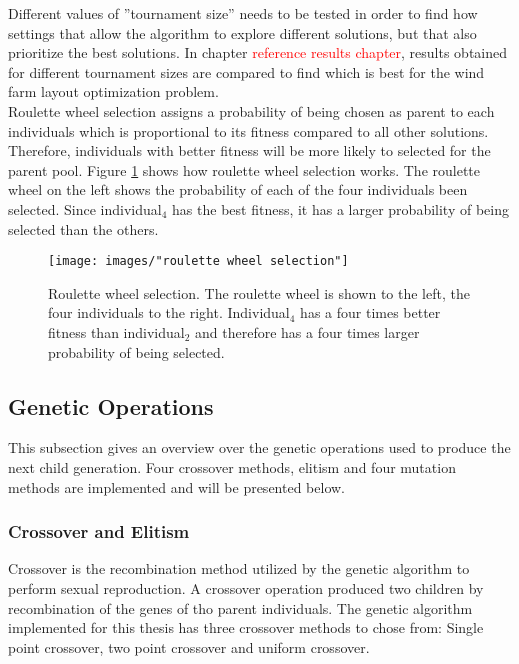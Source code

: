 \documentclass{article}
\begin{document}
\noindent Different values of ''tournament size'' needs to be tested in order to find how settings that allow the algorithm to explore different solutions, but that also prioritize the best solutions. In chapter \textcolor{red}{reference results chapter}, results obtained for different tournament sizes are compared to find which is best for the wind farm layout optimization problem. \\


\noindent Roulette wheel selection assigns a probability of being chosen as parent to each individuals which is proportional to its fitness compared to all other solutions. Therefore, individuals with better fitness will be more likely to selected for the parent pool. Figure \ref{figure:roulette wheel selection} shows how roulette wheel selection works. The roulette wheel on the left shows the probability of each of the four individuals been selected. Since individual$_4$ has the best fitness, it has a larger probability of being selected than the others. \\


\begin{figure}[h!]
\begin{center}
\texttt{[image: images/"roulette wheel selection"]}
\caption{Roulette wheel selection. The roulette wheel is shown to the left, the four individuals to the right. Individual$_4$ has a four times better fitness than individual$_2$ and therefore has a four times larger probability of being selected.}
\label{figure:roulette wheel selection}
\end{center}
\end{figure}


\subsection{Genetic Operations}\label{subsection:genetic operations}
This subsection gives an overview over the genetic operations used to produce the next child generation. Four crossover methods, elitism and four mutation methods are implemented and will be presented below. 


\subsubsection{Crossover and Elitism}
Crossover is the recombination method utilized by the genetic algorithm to perform sexual reproduction. A crossover operation produced two children by recombination of the genes of tho parent individuals. The genetic algorithm implemented for this thesis has three crossover methods to chose from: Single point crossover, two point crossover and uniform crossover.
\end{document}
